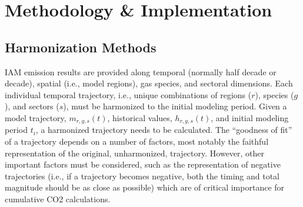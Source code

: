 \section{Methodology \& Implementation}\label{sec:meths}

\subsection{Harmonization Methods}

IAM emission results are provided along temporal (normally half decade or
decade), spatial (i.e., model regions), gas species, and sectoral
dimensions. Each individual temporal trajectory, i.e., unique combinations of
regions ($r$), species ($g$), and sectors ($s$), must be harmonized to the
initial modeling period. Given a model trajectory, $m_{r, g, s}(t)$, historical
values, $h_{r, g, s}(t)$, and initial modeling period $t_i$, a harmonized
trajectory needs to be calculated. The ``goodness of fit'' of a trajectory depends on
% 
% 
a number of factors, most notably the faithful representation of the original,
unharmonized, trajectory. However, other important factors must be considered,
such as the representation of negative trajectories (i.e., if a trajectory
becomes negative, both the timing and total magnitude should be as close as
possible) which are of critical importance for cumulative CO2 calculations.
% 
% 

